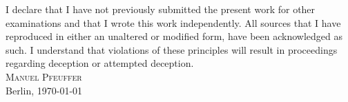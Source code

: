 I declare that I have not previously submitted the  present  work  for  other  examinations and that I wrote this work independently.
All sources that I have reproduced in either an unaltered or modified form, have been acknowledged as such.
I understand that violations of these principles will result in proceedings regarding deception or attempted deception.
\vspace{2cm}\\
\textsc{Manuel Pfeuffer}\\
Berlin, {\AdvanceDate[1]\today}
